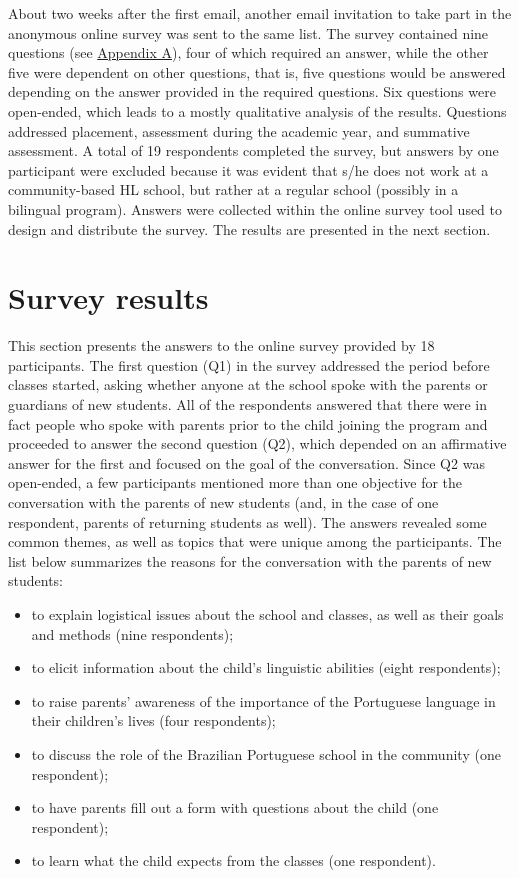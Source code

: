 \documentclass[output=paper]{langscibook}
\begin{document}
About two weeks after the first email, another email invitation to take part in the anonymous online survey was sent to the same list. The survey contained nine questions (see \hyperlink{appendixA}{Appendix A}), four of which required an answer, while the other five were dependent on other questions, that is, five questions would be answered depending on the answer provided in the required questions. Six questions were open-ended, which leads to a mostly qualitative analysis of the results. Questions addressed placement, assessment during the academic year, and summative assessment. A total of 19 respondents completed the survey, but answers by one participant were excluded because it was evident that s/he does not work at a community-based HL school, but rather at a regular school (possibly in a bilingual program). Answers were collected within the online survey tool used to design and distribute the survey. The results are presented in the next section.

\section{Survey results}\label{sec:6:5}

  This section presents the answers to the online survey provided by 18 participants. The first question (Q1) in the survey addressed the period before classes started, asking whether anyone at the school spoke with the parents or guardians of new students. All of the respondents answered that there were in fact people who spoke with parents prior to the child joining the program and proceeded to answer the second question (Q2), which depended on an affirmative answer for the first and focused on the goal of the conversation. Since Q2 was open-ended, a few participants mentioned more than one objective for the conversation with the parents of new students (and, in the case of one respondent, parents of returning students as well). The answers revealed some common themes, as well as topics that were unique among the participants. The list below summarizes the reasons for the conversation with the parents of new students:

\begin{itemize}
\item  to explain logistical issues about the school and classes, as well as their goals and methods (nine respondents);
\item  \begin{sloppypar}to elicit information about the child’s linguistic abilities (eight respondents);\end{sloppypar}
\item  to raise parents’ awareness of the importance of the Portuguese language in their children’s lives (four respondents);
\item  to discuss the role of the Brazilian Portuguese school in the community (one respondent);
\item  to have parents fill out a form with questions about the child (one respondent);
\item  to learn what the child expects from the classes (one respondent).
\end{itemize}
\end{document}
